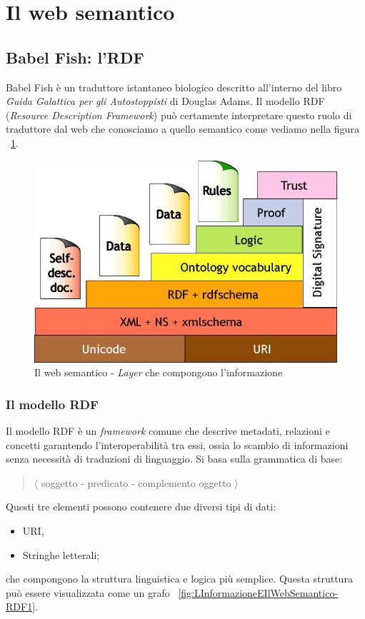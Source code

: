 	\section{Il web semantico}
	
		\subsection{Babel Fish: l'RDF}
			Babel Fish è un traduttore istantaneo biologico descritto all'interno del libro \emph{Guida Galattica per gli Autostoppisti} di Douglas Adams. Il modello RDF (\emph{Resource Description Framework}) può certamente interpretare questo ruolo di traduttore dal web che conosciamo a quello semantico come vediamo nella figura ~\ref{fig:LInformazioneEIlWebSemantico-WebSemantico}.
			
			\begin{figure}
				\centering
				\includegraphics[scale=0.5]{images/LInformazioneEIlWebSemantico-WebSemantico1}
				\caption{Il web semantico - \emph{Layer} che compongono l'informazione}
				\label{fig:LInformazioneEIlWebSemantico-WebSemantico}
			\end{figure}			
			
			\subsubsection{Il modello RDF}
				Il modello RDF è un \emph{framework} comune che descrive metadati, relazioni e concetti garantendo l'interoperabilità tra essi, ossia lo scambio di informazioni senza necessità di traduzioni di linguaggio. Si basa sulla grammatica di base:
				\begin{quote}
					$\langle$ soggetto - predicato - complemento oggetto $\rangle$
				\end{quote}
				Questi tre elementi possono contenere due diversi tipi di dati:
					\begin{itemize}
						\item URI,
						\item Stringhe letterali;
					\end{itemize}
				che compongono la struttura linguistica e logica più semplice. Questa struttura può essere visualizzata come un grafo ~\ref{fig:LInformazioneEIlWebSemantico-RDF1}.
				
